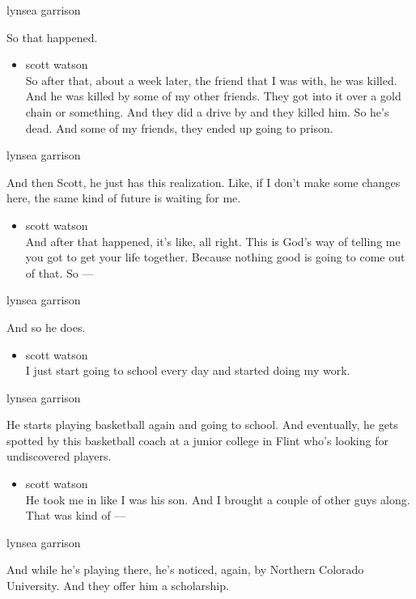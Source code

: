lynsea garrison

So that happened.

\begin{itemize}
\tightlist
\item
  scott watson\\
  So after that, about a week later, the friend that I was with, he was
  killed. And he was killed by some of my other friends. They got into
  it over a gold chain or something. And they did a drive by and they
  killed him. So he's dead. And some of my friends, they ended up going
  to prison.
\end{itemize}

lynsea garrison

And then Scott, he just has this realization. Like, if I don't make some
changes here, the same kind of future is waiting for me.

\begin{itemize}
\tightlist
\item
  scott watson\\
  And after that happened, it's like, all right. This is God's way of
  telling me you got to get your life together. Because nothing good is
  going to come out of that. So ---
\end{itemize}

lynsea garrison

And so he does.

\begin{itemize}
\tightlist
\item
  scott watson\\
  I just start going to school every day and started doing my work.
\end{itemize}

lynsea garrison

He starts playing basketball again and going to school. And eventually,
he gets spotted by this basketball coach at a junior college in Flint
who's looking for undiscovered players.

\begin{itemize}
\tightlist
\item
  scott watson\\
  He took me in like I was his son. And I brought a couple of other guys
  along. That was kind of ---
\end{itemize}

lynsea garrison

And while he's playing there, he's noticed, again, by Northern Colorado
University. And they offer him a scholarship.

